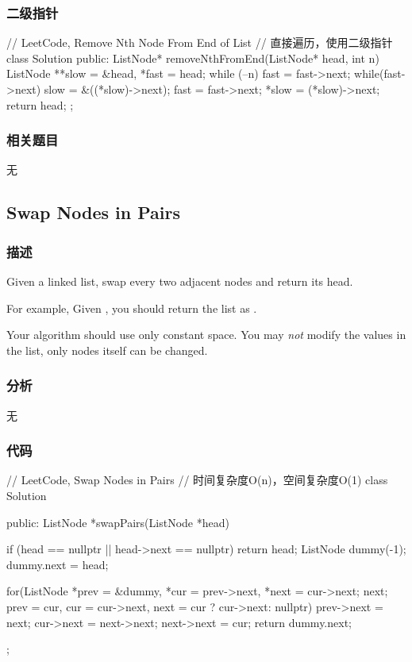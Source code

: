 \subsubsection{二级指针}
\begin{Code}
// LeetCode, Remove Nth Node From End of List
// 直接遍历，使用二级指针
class Solution {
    public:
    ListNode* removeNthFromEnd(ListNode* head, int n) {
        ListNode **slow = &head, *fast = head;
        while (--n) fast = fast->next;
        while(fast->next) {
            slow = &((*slow)->next);
            fast = fast->next;
        }
        *slow = (*slow)->next;
        return head;
    }
};
\end{Code}

\subsubsection{相关题目}

\begindot
\item 无
\myenddot


\subsection{Swap Nodes in Pairs}
\label{sec:swap-nodes-in-pairs}


\subsubsection{描述}
Given a linked list, swap every two adjacent nodes and return its head.

For example,
Given , you should return the list as .

Your algorithm should use only constant space. You may \emph{not} modify the values in the list, only nodes itself can be changed.


\subsubsection{分析}
无


\subsubsection{代码}
\begin{Code}
// LeetCode, Swap Nodes in Pairs
// 时间复杂度O(n)，空间复杂度O(1)
class Solution {
public:
    ListNode *swapPairs(ListNode *head) {
        if (head == nullptr || head->next == nullptr) return head;
        ListNode dummy(-1);
        dummy.next = head;

        for(ListNode *prev = &dummy, *cur = prev->next, *next = cur->next;
                next;
                prev = cur, cur = cur->next, next = cur ? cur->next: nullptr) {
            prev->next = next;
            cur->next = next->next;
            next->next = cur;
        }
        return dummy.next;
    }
};
\end{Code}


